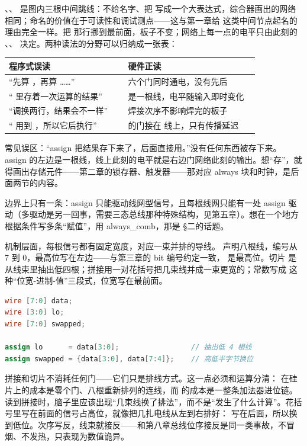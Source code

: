 、、 是图内三根中间跳线：不给名字、把  写成一个大表达式，综合器画出的网络相同；命名的价值在于可读性和调试测点——这与第一章给  这类中间节点起名的理由完全一样。把  那行挪到最前面，板子不变；网络上每一点的电平只由此刻的 、、 决定。两种读法的分野可以归纳成一张表：

\begin{longtable}{L{0.4\linewidth}L{0.44\linewidth}}
\toprule
程序式误读 & 硬件正读 \\
\midrule
“先算 ，再算 ……” & 六个门同时通电，没有先后 \\
“ 里存着一次运算的结果” &  是一根线，电平随输入即时变化 \\
“调换两行，结果会不一样” & 焊接次序不影响焊完的板子 \\
“ 用到 ，所以它后执行” &  的门接在  线上，只有传播延迟 \\
\bottomrule
\end{longtable}

\begin{warningbox}
常见误区：“assign 把结果存下来了，后面直接用。”没有任何东西被存下来。assign 的左边是一根线，线上此刻的电平就是右边门网络此刻的输出。想“存”，就得画出存储元件——第二章的锁存器、触发器——那对应 always 块和时钟，是后面两节的内容。
\end{warningbox}

边界上只有一条：assign 只能驱动线网型信号，且每根线网只能有一处 assign 驱动（多驱动是另一回事，需要三态总线那种特殊结构，见第五章）。想在一个地方根据条件写多条“赋值”，用 always\_comb，那是 §二的话题。

机制层面，每根信号都有固定宽度，对应一束并排的导线。 声明八根线，编号从 7 到 0，最高位写在左边——与第三章的 bit 编号约定一致， 是最高位。切片  是从线束里抽出低四根；拼接用一对花括号把几束线并成一束更宽的；常数写成  这种“位宽-进制-值”三段式，位宽写在最前面。

\begin{lstlisting}[language=Verilog]
wire [7:0] data;
wire [3:0] lo;
wire [7:0] swapped;

assign lo      = data[3:0];                 // 抽出低 4 根线
assign swapped = {data[3:0], data[7:4]};    // 高低半字节换位
\end{lstlisting}

拼接和切片不消耗任何门——它们只是排线方式。这一点必须和运算分清： 在硅片上的成本是零个门、八根重新排列的连线，而  的成本是一整条加法器进位链。读到拼接时，脑子里应该出现“几束线换了排法”，而不是“发生了什么计算”。花括号里写在前面的信号占高位，就像把几扎电线从左到右排好： 写在后面，所以换到低位。次序写反，线束就接反——和第八章总线位序接反是同一类事故，不冒烟、不发热，只表现为数值诡异。

